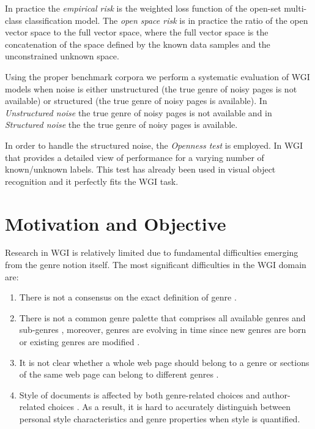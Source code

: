 In practice the \textit{empirical risk} is the weighted loss function of the open-set multi-class classification model. The \textit{open space risk} is in practice the ratio of the open vector space to the full vector space, where the full vector space is the concatenation of the space defined by the known data samples and the unconstrained unknown space.

Using the proper benchmark corpora we perform a systematic evaluation of WGI models when noise is either unstructured (the true genre of noisy pages is not available) or structured (the true genre of noisy pages is available). In \textit{Unstructured noise} the true genre of noisy pages is not available and in \textit{Structured noise} the the true genre of noisy pages is available.

In order to handle the structured noise, the \textit{Openness test} is employed.  In WGI that provides a detailed view of performance for a varying number of known/unknown labels. This test has already been used in visual object recognition \parencite{scheirer2013toward} and it perfectly fits the WGI task.

\section{Motivation and Objective} \label{chap:introduction:sec:motivation_objective}

Research in WGI is relatively limited due to fundamental difficulties emerging from the genre notion itself. The most significant difficulties in the WGI domain are:

\begin{enumerate}
\item There is not a consensus on the exact definition of genre \parencite{crowston2011problems}. 
\item There is not a common genre palette that comprises all available genres and sub-genres \parencite{santini2011cross,mehler2010genres_on_web,mason2009n,sharoff2010web}, moreover, genres are evolving in time since new genres are born or existing genres are modified \parencite{Boese2005}. 
\item It is not clear whether a whole web page should belong to a genre or sections of the same web page can belong to different genres \parencite{jebari2015combination,madjarov2015web}. 
\item Style of documents is affected by both genre-related choices and author-related choices \parencite{petrenz2011stable,Sharroff2010}. As a result, it is hard to accurately distinguish between personal style characteristics and genre properties when style is quantified.
\end{enumerate}

